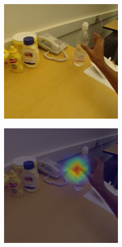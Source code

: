 \documentclass[10pt,twocolumn,hidelinks,letterpaper]{article}
\begin{document}
\begin{figure}[t]
  \centering
  \begin{subfigure}{.32\linewidth}
  	\includegraphics[width=\linewidth]{images/Cams3/S2_take_water/rgb0004.png}
  \end{subfigure}
  \begin{subfigure}{.32\linewidth}
  	\includegraphics[width=\linewidth]{images/Cams3/S2_take_water/rgb0004_CAM.png}

\end{subfigure}
\end{figure}
\end{document}

